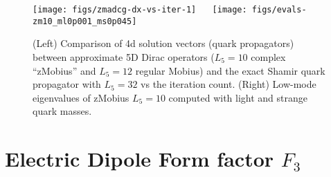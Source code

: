 \documentclass{PoS}
\begin{document}
\begin{figure}[ht!]
\centering
\texttt{[image: figs/zmadcg-dx-vs-iter-1]}~
\hspace{.05\textwidth}~
\texttt{[image: figs/evals-zm10\_ml0p001\_ms0p045]}
\caption{ (Left) Comparison of 4d solution vectors (quark propagators) between approximate
  5D Dirac operators ($L_5=10$ complex ``zMobius'' and $L_5=12$ regular Mobius)
  and the exact Shamir quark propagator with $L_5=32$ vs the iteration count.
  (Right) Low-mode eigenvalues of zMobius $L_5=10$ computed with light and strange 
  quark masses. \label{fig:mobius-study}}
\end{figure}



\section{Electric Dipole Form factor $F_3$}
\end{document}
